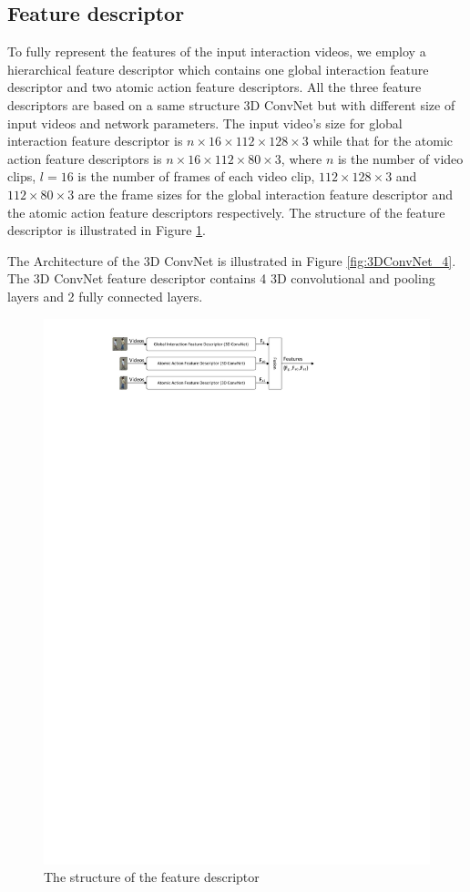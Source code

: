 \subsection{Feature descriptor}
To fully represent the features of the input interaction videos, we employ a hierarchical feature descriptor which contains one global interaction feature descriptor and two atomic action feature descriptors. All the three feature descriptors are based on a same structure 3D ConvNet but with different size of input videos and network parameters. The input video's size for global interaction feature descriptor is \(n \times 16 \times 112 \times 128 \times 3\) while that for the atomic action feature descriptors is \(n \times 16 \times 112 \times 80 \times 3\), where \(n\) is the number of video clips, \(l = 16\) is the number of frames of each video clip, \(112 \times 128 \times 3\) and \(112 \times 80 \times 3\) are the frame sizes for the global interaction feature descriptor and the atomic action feature descriptors respectively. The structure of the feature descriptor is illustrated in Figure \ref{fig:feature_descriptor}.  
\par
\label{3dconv_layers}
The Architecture of the 3D ConvNet is illustrated in Figure \ref{fig:3DConvNet_4}. The 3D ConvNet feature descriptor contains 4 3D convolutional and pooling layers and 2 fully connected layers.  
\begin{figure}
	\includegraphics[trim=2cm 25.5cm 0cm 1cm]{fig01/feature_descriptor.pdf}
	\caption{The structure of the feature descriptor}
	\label{fig:feature_descriptor}
\end{figure} 
